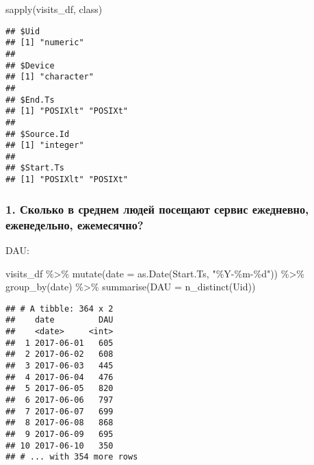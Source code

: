 \documentclass[
]{article}
\newenvironment{Shaded}{\begin{snugshade}}{\end{snugshade}}
\newcommand{\AttributeTok}[1]{\textcolor[rgb]{0.77,0.63,0.00}{#1}}
\newcommand{\FunctionTok}[1]{\textcolor[rgb]{0.00,0.00,0.00}{#1}}
\newcommand{\NormalTok}[1]{#1}
\newcommand{\SpecialCharTok}[1]{\textcolor[rgb]{0.00,0.00,0.00}{#1}}
\newcommand{\StringTok}[1]{\textcolor[rgb]{0.31,0.60,0.02}{#1}}
\begin{document}
\begin{Shaded}
\begin{Highlighting}[]
\FunctionTok{sapply}\NormalTok{(visits\_df, class)}
\end{Highlighting}
\end{Shaded}

\begin{verbatim}
## $Uid
## [1] "numeric"
## 
## $Device
## [1] "character"
## 
## $End.Ts
## [1] "POSIXlt" "POSIXt" 
## 
## $Source.Id
## [1] "integer"
## 
## $Start.Ts
## [1] "POSIXlt" "POSIXt"
\end{verbatim}

\hypertarget{ux441ux43aux43eux43bux44cux43aux43e-ux432-ux441ux440ux435ux434ux43dux435ux43c-ux43bux44eux434ux435ux439-ux43fux43eux441ux435ux449ux430ux44eux442-ux441ux435ux440ux432ux438ux441-ux435ux436ux435ux434ux43dux435ux432ux43dux43e-ux435ux436ux435ux43dux435ux434ux435ux43bux44cux43dux43e-ux435ux436ux435ux43cux435ux441ux44fux447ux43dux43e}{%
\subsubsection{1. Сколько в среднем людей посещают сервис ежедневно,
еженедельно,
ежемесячно?}\label{ux441ux43aux43eux43bux44cux43aux43e-ux432-ux441ux440ux435ux434ux43dux435ux43c-ux43bux44eux434ux435ux439-ux43fux43eux441ux435ux449ux430ux44eux442-ux441ux435ux440ux432ux438ux441-ux435ux436ux435ux434ux43dux435ux432ux43dux43e-ux435ux436ux435ux43dux435ux434ux435ux43bux44cux43dux43e-ux435ux436ux435ux43cux435ux441ux44fux447ux43dux43e}}

DAU:

\begin{Shaded}
\begin{Highlighting}[]
\NormalTok{visits\_df }\SpecialCharTok{\%\textgreater{}\%} 
  \FunctionTok{mutate}\NormalTok{(}\AttributeTok{date =} \FunctionTok{as.Date}\NormalTok{(Start.Ts, }\StringTok{"\%Y{-}\%m{-}\%d"}\NormalTok{)) }\SpecialCharTok{\%\textgreater{}\%} 
  \FunctionTok{group\_by}\NormalTok{(date) }\SpecialCharTok{\%\textgreater{}\%} 
  \FunctionTok{summarise}\NormalTok{(}\AttributeTok{DAU =} \FunctionTok{n\_distinct}\NormalTok{(Uid))}
\end{Highlighting}
\end{Shaded}

\begin{verbatim}
## # A tibble: 364 x 2
##    date         DAU
##    <date>     <int>
##  1 2017-06-01   605
##  2 2017-06-02   608
##  3 2017-06-03   445
##  4 2017-06-04   476
##  5 2017-06-05   820
##  6 2017-06-06   797
##  7 2017-06-07   699
##  8 2017-06-08   868
##  9 2017-06-09   695
## 10 2017-06-10   350
## # ... with 354 more rows
\end{verbatim}
\end{document}
